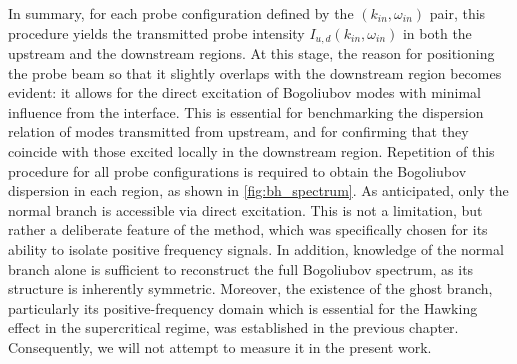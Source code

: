 In summary, for each probe configuration defined by the \((k_{in}, \omega_{in})\) pair, this procedure yields the transmitted probe intensity \(I_{u,d}(k_{in}, \omega_{in})\) in both the upstream and the downstream regions.
At this stage, the reason for positioning the probe beam so that it slightly overlaps with the downstream region becomes evident: it allows for the direct excitation of Bogoliubov modes with minimal influence from the interface. This is essential for benchmarking the dispersion relation of modes transmitted from upstream, and for confirming that they coincide with those excited locally in the downstream region.
Repetition of this procedure for all probe configurations is required to obtain the Bogoliubov dispersion in each region, as shown in \autoref{fig:bh_spectrum}.  As anticipated, only the normal branch is accessible via direct excitation. This is not a limitation, but rather a deliberate feature of the method, which was specifically chosen for its ability to isolate positive frequency signals. 
In addition, knowledge of the normal branch alone is sufficient to reconstruct the full Bogoliubov spectrum, as its structure is inherently symmetric. Moreover, the existence of the ghost branch, particularly its positive-frequency domain which is essential for the Hawking effect in the supercritical regime, was established in the previous chapter. Consequently, we will not attempt to measure it in the present work.
